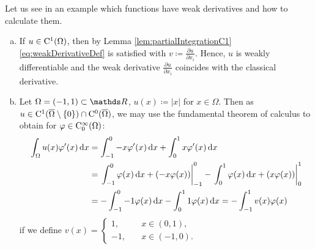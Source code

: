 Let us see in an example which functions have weak derivatives and how to calculate them.

\begin{ex} 
\label{ex:weakDerivative}
  \begin{enumerate}[a)]
    \item If $u \in \mathrm{C}^1(\Omega)$, then by Lemma \ref{lem:partialIntegrationC1} \eqref{eq:weakDerivativeDef} is satisfied with $v \coloneqq \frac{\partial u}{\partial x_i}$.
      Hence, $u$ is weakly differentiable and the weak derivative $\frac{\partial u}{\partial x_i}$ coincides with the classical derivative.
    \item Let $\Omega = (-1,1) \subset \R$, $u(x) \coloneqq |x|$ for $x \in \Omega$.
      Then as $u \in \mathrm{C}^1(\overline \Omega \setminus \{0\}) \cap \mathrm{C}^0(\overline \Omega)$, we may use the fundamental theorem of calculus to obtain for $\varphi \in \mathrm{C}_0^\infty(\Omega)$:
      \begin{align*}
        \int_\Omega u(x) \varphi^\prime(x) \, {\operatorname{d}\!{x}} 
        &= \int_{-1}^0 -x \varphi^\prime(x) \, {\operatorname{d}\!{x}} + \int_0^1 x \varphi^\prime(x) \, {\operatorname{d}\!{x}} \\
        &= \left.\int_{-1}^0 \varphi(x) \, {\operatorname{d}\!{x}} + (-x \varphi(x))\right|_{-1}^0 - \left.\int_0^1 \varphi(x) \, {\operatorname{d}\!{x}} + (x \varphi(x))\right|_0^1 \\
        &= -\int_{-1}^0 -1 \varphi(x) \, {\operatorname{d}\!{x}} - \int_0^1 1 \varphi(x) \, {\operatorname{d}\!{x}}
        = -\int_{-1}^1 v(x) \varphi(x)
      \end{align*}
      if we define $v(x) = \begin{cases} 1, &\quad x \in (0,1), \\ -1, &\quad x \in (-1,0). \end{cases}$


\end{enumerate}
\end{ex}
